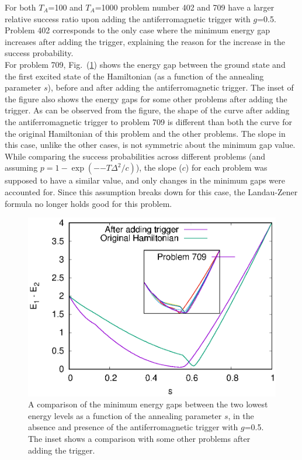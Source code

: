 \documentclass[../main.tex]{subfiles}
\begin{document}
For both $T_A$=100 and $T_A$=1000 problem number 402 and 709 have a larger relative success ratio upon adding the antiferromagnetic trigger with $g$=0.5. Problem 402 corresponds to the only case where the minimum energy gap increases after adding the trigger, explaining the reason for the increase in the success probability.\\
For problem 709, Fig.~(\ref{fig:a15}) shows the energy gap between the ground state and the first excited state of the Hamiltonian (as a function of the annealing parameter $s$), before and after adding the antiferromagnetic trigger. The inset of the figure also shows the energy gaps for some other problems after adding the trigger. As can be observed from the figure, the shape of the curve after adding the antiferromagnetic trigger to problem 709 is different than both the curve for the original Hamiltonian of this problem and the other problems. The slope in this case, unlike the other cases, is not symmetric about the minimum gap value. While comparing the success probabilities across different problems (and assuming $p=1-\exp({-{-T {\Delta}^2/c}})$), the slope ($c$) for each problem was supposed to have a similar value, and only changes in the minimum gaps were accounted for. Since this assumption breaks down for this case, the Landau-Zener formula no longer holds good for this problem.\\

\begin{figure}
\centering 
\includegraphics[scale=0.8 ]{Mingap_709_g0_A.eps}
\caption{A comparison of the minimum energy gaps between the two lowest energy levels as a function of the annealing parameter $s$, in the absence and presence of the antiferromagnetic trigger with $g$=0.5. The inset shows a comparison with some other problems after adding the trigger.}
\label{fig:a15}
\end{figure}
\end{document}
